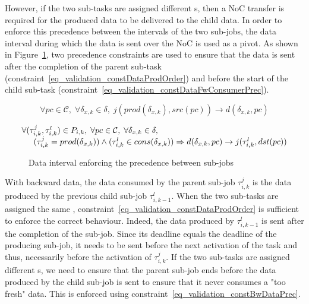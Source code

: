 \documentclass[main.tex]{subfiles}
\begin{document}
However, if the two sub-tasks are assigned different \PN{}s, then a NoC
transfer is required for the produced data to be delivered to the child data.
In order to enforce this precedence between the intervals of the two sub-jobs,
the data interval during which the data is sent over the NoC is used as a
pivot. As shown in Figure~\ref{fig_validation_constFwDataPrec}, two precedence
constraints are used to ensure that the data is sent after the completion of
the parent sub-task (constraint~\ref{eq_validation_constDataProdOrder}) and
before the start of the child sub-task
(constraint~\ref{eq_validation_constDataFwConsumerPrec}). 

\begin{equation}
    \label{eq_validation_constDataProdOrder}
    \forall pc \in \mathcal{C} , \; \forall \delta_{x,k} \in \delta , \;
    j(prod(\delta_{x,k}) , src(pc)) \to d( \delta_{x,k} , pc )   
\end{equation}

\begin{equation}
    \label{eq_validation_constDataFwConsumerPrec}
    \begin{array}{l}
        \forall (\tau_{i,k}^j , \tau_{i,k}^l) \in P_{i,k}, \; \forall pc \in \mathcal{C} , \; \forall \delta_{x,k} \in \delta , \;  \\
        \hspace{5mm} (\tau_{i,k}^j = prod(\delta_{x,k})) \land (\tau_{i,k}^l \in cons(\delta_{x,k})) 
        \Rightarrow d( \delta_{x,k} , pc ) \to j(\tau_{i,k}^l , dst(pc)) 
    \end{array}
\end{equation}

\begin{figure}
    \centering
    \scalebox{0.9}{}
    \caption{Data interval enforcing the precedence between sub-jobs}
    \label{fig_validation_constFwDataPrec}
\end{figure}

With backward data, the data consumed by the parent sub-job $\tau_{i,k}^j$ is
the data produced by the previous child sub-job $\tau_{i,k-1}^l$. When the two
sub-tasks are assigned the same \PN{},
constraint~\ref{eq_validation_constDataProdOrder} is sufficient to enforce the
correct behaviour. Indeed, the data produced by $\tau_{i,k-1}^l$ is sent after
the completion of the sub-job. Since its deadline equals the deadline of the
producing sub-job, it needs to be sent before the next activation of the task
and thus, necessarily before the activation of $\tau_{i,k}^j$. If the two
sub-tasks are assigned different \PN{}s, we need to ensure that the parent
sub-job ends before the data produced by the child sub-job is sent to ensure
that it never consumes a "too fresh" data. This is enforced using
constraint~\ref{eq_validation_constBwDataPrec}.
\end{document}

